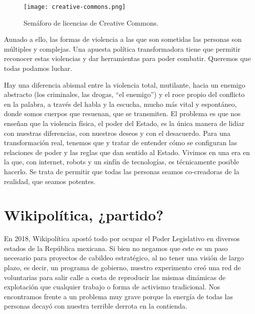 \begin{figure}[htbp]
	\centering	\texttt{[image: creative-commons.png]}
	\caption{Semáforo de licencias de Creative Commons.}
	\label{fig:CCsignal}
\end{figure}

Aunado a ello, las formas de violencia a las que son sometidas las personas son múltiples y complejas. Una apuesta política transformadora tiene que permitir reconocer estas violencias y dar herramientas para poder combatir. Queremos que todas podamos luchar.

Hay una diferencia abismal entre la violencia total, mutilante, hacia un enemigo abstracto (los criminales, las drogas, \enquote{el enemigo}\revquotes{}) y el roce propio del conflicto en la palabra, a través del habla y la escucha, mucho más vital y espontáneo, donde somos cuerpos que resuenan, que se transmiten. El problema es que nos enseñan que la violencia física, el poder del Estado, es la única manera de lidiar con nuestras diferencias, con nuestros deseos y con el desacuerdo. Para una transformación real, tenemos que  y tratar de entender cómo se configuran las relaciones de poder y las reglas que dan sentido al Estado. Vivimos en una era en la que, con internet, robots y un sinfín de tecnologías, es técnicamente posible hacerlo. Se trata de permitir que todas las personas seamos co-creadoras de la realidad, que seamos potentes.

\section{Wikipolítica, ¿partido?}
\label{sec:wikipartido}

En 2018, Wikipolítica apostó todo por ocupar el Poder Legislativo en diversos estados de la República mexicana. Si bien no negamos que este es un paso necesario para proyectos de cabildeo estratégico, al no tener una visión de largo plazo, es decir, un programa de gobierno, nuestro experimento creó una red de voluntarias para salir calle a costa de reproducir las mismas dinámicas de explotación que cualquier trabajo o forma de activismo tradicional. Nos encontramos frente a un problema muy grave porque la energía de todas las personas decayó con nuestra terrible derrota en la contienda.

